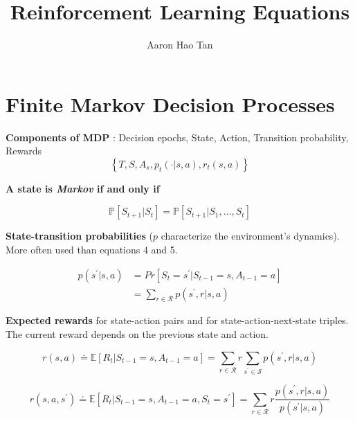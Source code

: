 \documentclass{article}
\author{Aaron Hao Tan}
\title{Reinforcement Learning Equations}
\date{\vspace{-5ex}}
\begin{document}
\maketitle

\noindent
\section{Finite Markov Decision Processes}

\noindent
\textbf{Components of MDP}
: {Decision epochs, State, Action, Transition probability,
Rewards}
\begin{equation}
\left\{T, S, A_{s}, p_{t}(\cdot | s, a), r_{t}(s, a)\right\}
\end{equation}

\noindent
\textbf{A state is \textit{Markov} if and only if}

\begin{equation}
\mathbb{P}\left[S_{t+1} | S_{t}\right]=\mathbb{P}\left[S_{t+1} | S_{1}, \ldots, S_{t}\right]
\end{equation}

\noindent
\textbf{State-transition probabilities}
($p$ characterize the environment's dynamics).
More often used than equations 4 and 5.

\begin{equation}
\begin{aligned}
p(s^{\prime} | s, a) &= Pr [S_{t} = s^{\prime} | S_{t-1}=s, A_{t-1}=a] \\
&=\sum_{r \in \mathcal{R}} p(s^{\prime}, r | s, a)
\end{aligned}
\end{equation}

\noindent
\textbf{Expected rewards }
for state-action pairs and for state-action-next-state triples.
The current reward depends on the previous state and action.

\begin{equation}
r(s, a) \doteq \mathbb{E} \left[R_{t} | S_{t-1}=s, A_{t-1}=a\right]=\sum_{r \in \mathcal{R}} r \sum_{s^{\prime} \in \mathcal{S}} p\left(s^{\prime}, r | s, a\right)
\end{equation}

\begin{equation}
r\left(s, a, s^{\prime}\right) \doteq \mathbb{E}\left[R_{t} | S_{t-1}=s, A_{t-1}=a, S_{t}=s^{\prime}\right]=\sum_{r \in \mathcal{R}} r \frac{p\left(s^{\prime}, r | s, a\right)}{p\left(s^{\prime} | s, a\right)}
\end{equation}
\end{document}
